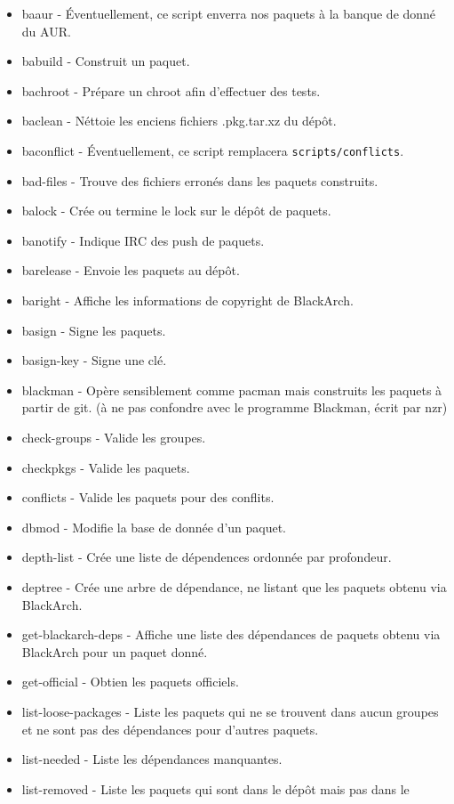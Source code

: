 \documentclass[a4paper, oneside, 11pt]{book}
\begin{document}
\begin{itemize}
\item baaur - Éventuellement, ce script enverra nos paquets à la banque de donné
du AUR.
\item babuild - Construit un paquet.
\item bachroot - Prépare un chroot afin d'effectuer des tests.
\item baclean - Néttoie les enciens fichiers .pkg.tar.xz du dépôt.
\item baconflict - Éventuellement, ce script remplacera \verb|scripts/conflicts|.
\item bad-files - Trouve des fichiers erronés dans les paquets construits.
\item balock - Crée ou termine le lock sur le dépôt de paquets.
\item banotify - Indique IRC des push de paquets.
\item barelease - Envoie les paquets au dépôt.
\item baright - Affiche les informations de copyright de BlackArch.
\item basign - Signe les paquets.
\item basign-key - Signe une clé.
\item blackman - Opère sensiblement comme pacman mais construits les paquets à
partir de git. (à ne pas confondre avec le programme Blackman, écrit par nzr)
\item check-groups - Valide les groupes.
\item checkpkgs - Valide les paquets.
\item conflicts - Valide les paquets pour des conflits.
\item dbmod - Modifie la base de donnée d'un paquet.
\item depth-list - Crée une liste de dépendences ordonnée par profondeur.
\item deptree - Crée une arbre de dépendance, ne listant que les paquets obtenu
via BlackArch.
\item get-blackarch-deps - Affiche une liste des dépendances de paquets obtenu 
via BlackArch pour un paquet donné.
\item get-official - Obtien les paquets officiels.
\item list-loose-packages - Liste les paquets qui ne se trouvent dans aucun
groupes et ne sont pas des dépendances pour d'autres paquets.
\item list-needed - Liste les dépendances manquantes.
\item list-removed - Liste les paquets qui sont dans le dépôt mais pas dans le

\end{itemize}
\end{document}
